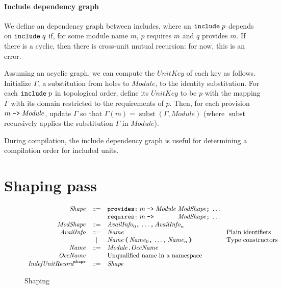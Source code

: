 \documentclass{article}
\newcommand{\I}[1]{\ensuremath{\mathit{#1}}}
\begin{document}
\paragraph{Include dependency graph}  We define an dependency graph
between includes, where an $\verb|include|\; p$ depends on
$\verb|include|\; q$ if, for some module name $m$, $p$ requires $m$ and
$q$ provides $m$.  If there is a cyclic, then there is cross-unit
mutual recursion: for now, this is an error.

Assuming an acyclic graph, we can compute the \I{UnitKey} of each
key as follows.  Initialize $\Gamma$, a substitution from holes to \I{Module},
to the identity substitution. For each $\verb|include|\; p$ in topological
order, define its \I{UnitKey} to be $p$ with the mapping $\Gamma$ with its
domain restricted to the requirements of $p$.  Then, for each provision
$m\; \verb|->|\; \I{Module}$, update $\Gamma$ so that
$\Gamma(m) = \operatorname{subst} (\Gamma, \I{Module})$
(where $\operatorname{subst}$ recursively applies the substitution $\Gamma$ in \I{Module}).

During compilation, the include dependency graph is useful for
determining a compilation order for included units.

\newpage
\section{Shaping pass}

\begin{figure}[htpb]
$$
\begin{array}{rcll}
\I{Shape} & ::= & \verb|provides:|\; m \; \verb|->|\; \I{Module}\; \I{ModShape} \verb|;|\; \ldots \\
      &     & \verb|requires:| \; m \; \verb|->|\; \textcolor{white}{\I{Module}}\; \I{ModShape}  \verb|;|\; \ldots \\
\I{ModShape} & ::= & \I{AvailInfo}_0 \verb|,|\, \ldots \verb|,|\, \I{AvailInfo}_n \\
\I{AvailInfo} & ::= & \I{Name} & \mbox{Plain identifiers} \\
          & |   & \I{Name} \, \verb|{| \, \I{Name}_0\verb|,| \, \ldots\verb|,| \, \I{Name}_n \, \verb|}| & \mbox{Type constructors} \\
\I{Name}   & ::= & \I{Module} \verb|.| \I{OccName} \\
\I{OccName} & & \mbox{Unqualified name in a namespace} \\
\I{IndefUnitRecord}^{\mathsf{shape}} & ::= & \I{Shape}
\end{array}
$$
\caption{Shaping} \label{fig:shaping}
\end{figure}
\end{document}
